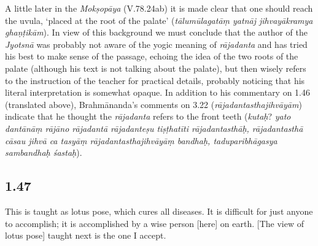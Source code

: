 \begin{ekdosis}
\begin{philcomm}[hp01_045]
A little later in the \emph{Mokṣopāya} (V.78.24ab) it is made clear that one should reach the uvula, `placed at the root of the palate' (\emph{tālumūlagatāṃ yatnāj jihvayākramya ghaṇṭikām}). In view of this background we must conclude that the author of the \emph{Jyotsnā} was probably not aware of the yogic meaning of \emph{rājadanta} and has tried his best to make sense of the passage,
echoing the idea of the two roots of the palate (although his text is not talking about the palate), but then wisely refers to the instruction of the teacher for practical details, probably noticing that his literal interpretation is somewhat opaque. In addition to his commentary on 1.46 (translated above), Brahmānanda’s comments on 3.22 (\emph{rājadantasthajihvāyām}) indicate that he thought the \emph{rājadanta} refers to the front teeth (\emph{kutaḥ}? \emph{yato dantānāṃ rājāno rājadantā rājadanteṣu tiṣṭhatīti rājadantasthāḥ, rājadantasthā cāsau jihvā ca tasyāṃ rājadantasthajihvāyāṃ bandhaḥ, taduparibhāgasya sambandhaḥ śastaḥ}).
\end{philcomm}





\subsection*{1.47}
\begin{translation}[hp01_047]
This is taught as lotus pose, which cures all diseases. It is difficult for just anyone to accomplish; it is accomplished by a wise person [here] on earth. [The view of lotus pose] taught next is the one I accept.  
\end{translation}


\end{ekdosis}
